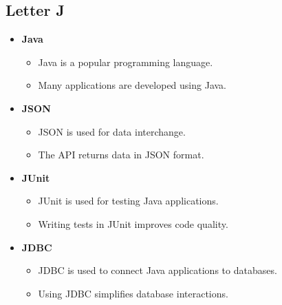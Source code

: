     \subsection{Letter J}
    \begin{itemize}
        \item \textbf{Java}
        \begin{itemize}
            \item Java is a popular programming language.
            \item Many applications are developed using Java.
        \end{itemize}
        \item \textbf{JSON}
        \begin{itemize}
            \item JSON is used for data interchange.
            \item The API returns data in JSON format.
        \end{itemize}
        \item \textbf{JUnit}
        \begin{itemize}
            \item JUnit is used for testing Java applications.
            \item Writing tests in JUnit improves code quality.
        \end{itemize}
        \item \textbf{JDBC}
        \begin{itemize}
            \item JDBC is used to connect Java applications to databases.
            \item Using JDBC simplifies database interactions.
        \end{itemize}
    \end{itemize}


